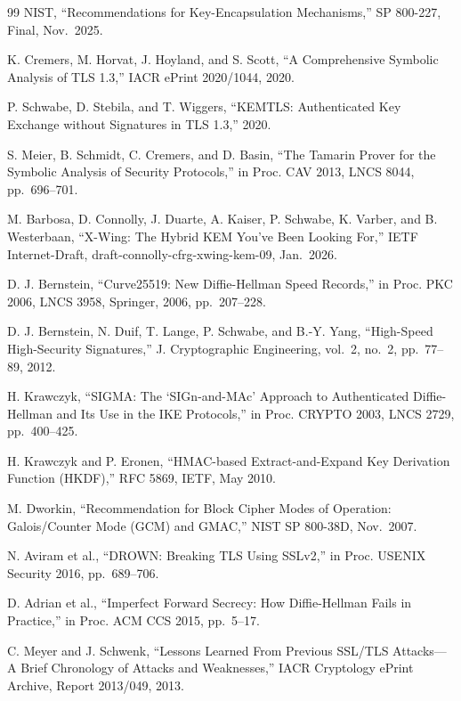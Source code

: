 \documentclass[10pt,journal,compsoc]{IEEEtran}
\begin{document}
\begin{thebibliography}{99}
 NIST, ``Recommendations for Key-Encapsulation Mechanisms,'' SP 800-227, Final, Nov.~2025.

 K. Cremers, M. Horvat, J. Hoyland, and S. Scott, ``A Comprehensive Symbolic Analysis of TLS 1.3,'' IACR ePrint 2020/1044, 2020.

 P. Schwabe, D. Stebila, and T. Wiggers, ``KEMTLS: Authenticated Key Exchange without Signatures in TLS 1.3,'' 2020.

 S. Meier, B. Schmidt, C. Cremers, and D. Basin, ``The Tamarin Prover for the Symbolic Analysis of Security Protocols,'' in Proc. CAV 2013, LNCS 8044, pp.~696--701.

 M. Barbosa, D. Connolly, J. Duarte, A. Kaiser, P. Schwabe, K. Varber, and B. Westerbaan, ``X-Wing: The Hybrid KEM You've Been Looking For,'' IETF Internet-Draft, draft-connolly-cfrg-xwing-kem-09, Jan.~2026.

 D. J. Bernstein, ``Curve25519: New Diffie-Hellman Speed Records,'' in Proc. PKC 2006, LNCS 3958, Springer, 2006, pp.~207--228.

 D. J. Bernstein, N. Duif, T. Lange, P. Schwabe, and B.-Y. Yang, ``High-Speed High-Security Signatures,'' J. Cryptographic Engineering, vol.~2, no.~2, pp.~77--89, 2012.

 H. Krawczyk, ``SIGMA: The `SIGn-and-MAc' Approach to Authenticated Diffie-Hellman and Its Use in the IKE Protocols,'' in Proc. CRYPTO 2003, LNCS 2729, pp.~400--425.

 H. Krawczyk and P. Eronen, ``HMAC-based Extract-and-Expand Key Derivation Function (HKDF),'' RFC 5869, IETF, May 2010.

 M. Dworkin, ``Recommendation for Block Cipher Modes of Operation: Galois/Counter Mode (GCM) and GMAC,'' NIST SP 800-38D, Nov.~2007.

 N. Aviram et al., ``DROWN: Breaking TLS Using SSLv2,'' in Proc. USENIX Security 2016, pp.~689--706.

 D. Adrian et al., ``Imperfect Forward Secrecy: How Diffie-Hellman Fails in Practice,'' in Proc. ACM CCS 2015, pp.~5--17.

 C. Meyer and J. Schwenk, ``Lessons Learned From Previous SSL/TLS Attacks---A Brief Chronology of Attacks and Weaknesses,'' IACR Cryptology ePrint Archive, Report 2013/049, 2013.


\end{thebibliography}
\end{document}
